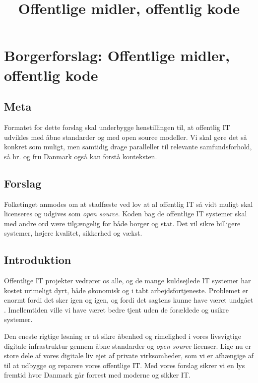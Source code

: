 \documentclass[fleqn]{article}
\title{Offentlige midler, offentlig kode}
\author{}
\begin{document}
\maketitle

\setcounter{secnumdepth}{0}

\section{Borgerforslag: Offentlige midler, offentlig kode}

\subsection{Meta}
Formatet for dette forslag skal underbygge henstillingen til, at offentlig IT udvikles
med åbne standarder og med open source modeller. Vi skal gøre det så konkret som muligt,
men samtidig drage paralleller til relevante samfundsforhold, så hr. og fru Danmark også 
kan forstå konteksten.

\subsection{Forslag}
\begin{large}
Folketinget anmodes om at stadfæste ved lov at al offentlig IT så vidt muligt skal licenseres
og udgives som \textit{open source}. Koden bag de offentlige IT systemer skal med andre ord
være tilgængelig for både borger og stat. Det vil sikre billigere systemer, højere
kvalitet, sikkerhed og vækst.
\end{large}

\subsection{Introduktion}
Offentlige IT projekter vedrører os alle, og de mange kuldsejlede IT systemer har
kostet urimeligt dyrt, både økonomisk og i tabt arbejdsfortjeneste. Problemet er enormt
fordi det sker igen og igen, og fordi det sagtens kunne have været undgået \cite{ITU}.
Imellemtiden ville vi have været bedre tjent uden de forældede og usikre systemer.

Den eneste rigtige løsning er at sikre åbenhed og rimelighed i vores livsvigtige
digitale infrastruktur gennem åbne standarder og \textit{open source} licenser.
Lige nu er store dele af vores digitale liv ejet af private virksomheder, som vi
er afhængige af til at udbygge og reparere vores offentlige IT. Med vores
forslag sikrer vi en lys fremtid hvor Danmark går forrest med moderne og sikker IT.
\end{document}
